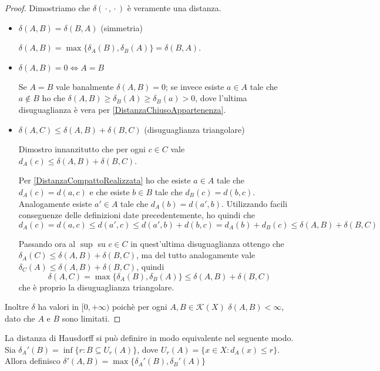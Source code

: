 \begin{proof}
	Dimostriamo che $\delta({}\cdot{},{}\cdot{})$ è veramente una distanza.
	\begin{itemize}
		\item $\delta(A,B)=\delta(B,A)$ (simmetria)
		
		$\delta(A,B)=\max\{ \delta_A(B),\delta_B(A) \}=\delta(B,A)$.
		\item $\delta(A,B)=0 \iff A=B$
		
		Se $A=B$ vale banalmente $\delta(A,B)=0$; se invece esiste $a\in A$ tale che $a\not\in B$ ho che $\delta(A,B)\ge \delta_B(A)\ge \delta_B(a)>0$, dove l'ultima disuguaglianza è vera per \cref{DistanzaChiusoAppartenenza}.
		\item $\delta(A,C)\le \delta(A,B)+\delta(B,C)$ (disuguaglianza triangolare)
		
		Dimostro innanzitutto che per ogni $c\in C$ vale $d_A(c)\le \delta(A,B)+\delta(B,C)$.
		
 		Per \cref{DistanzaCompattoRealizzata} ho che esiste $a\in A$ tale che $d_A(c)=d(a,c)$ e che esiste $b\in B$ tale che $d_B(c)=d(b,c)$. Analogamente esiste $a'\in A$ tale che $d_A(b)=d(a',b)$. Utilizzando facili conseguenze delle definizioni date precedentemente, ho quindi che 
 		\begin{equation*}
 			d_A(c)=d(a,c)\le d(a',c) \le d(a',b)+d(b,c)=d_A(b)+d_B(c)\le \delta(A,B)+\delta(B,C)
 		\end{equation*}
 		
 		Passando ora al $\sup$ su $c\in C$ in quest'ultima disuguaglianza ottengo che $\delta_A(C)\le \delta(A,B)+\delta(B,C)$, ma del tutto  analogamente vale $\delta_C(A)\le \delta(A,B)+\delta(B,C)$, quindi
 		\begin{equation*}
 			\delta(A,C)=\max\{ \delta_A(B),\delta_B(A) \}\le \delta(A,B)+\delta(B,C)
 		\end{equation*}
		che è proprio la disuguaglianza triangolare.
	\end{itemize}
	Inoltre $\delta$ ha valori in $[0,+\infty)$ poichè per ogni $A,B\in \mathcal{K}(X)$ $\delta(A,B)<\infty$, dato che $A$ e $B$ sono limitati.
\end{proof}

\begin{definition} \label{HausdorffDefinizioneEquivalente}
	La distanza di Hausdorff si può definire in modo equivalente nel seguente modo. Sia $\delta_A'(B)=\inf\{r:B\subseteq U_r(A)\}$, dove $U_r(A)=\{x\in X : d_A(x)\le r \}$. Allora definisco $\delta'(A,B)=\max\{\delta_A'(B),\delta_B'(A)\}$
\end{definition}

